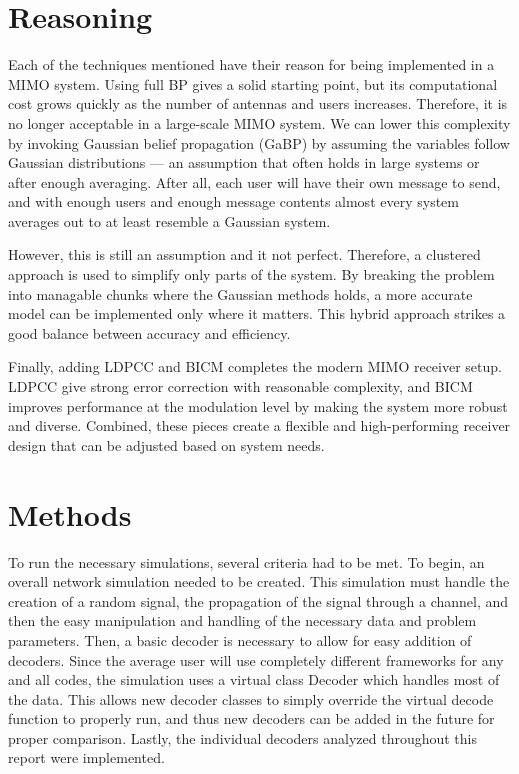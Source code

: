 \documentclass[conference]{IEEEtran}
\begin{document}
\section{Reasoning}
Each of the techniques mentioned have their reason for being implemented in a MIMO system. Using full BP gives a solid starting point, but its computational cost grows quickly as the number of antennas and users increases. Therefore, it is no longer acceptable in a large-scale MIMO system. We can lower this complexity by invoking Gaussian belief propagation (GaBP) by assuming the variables follow Gaussian distributions — an assumption that often holds in large systems or after enough averaging. After all, each user will have their own message to send, and with enough users and enough message contents almost every system averages out to at least resemble a Gaussian system.\par
However, this is still an assumption and it not perfect. Therefore, a clustered approach is used to simplify only parts of the system. By breaking the problem into managable chunks where the Gaussian methods holds, a more accurate model can be implemented only where it matters. This hybrid approach strikes a good balance between accuracy and efficiency.

Finally, adding LDPCC and BICM completes the modern MIMO receiver setup. LDPCC give strong error correction with reasonable complexity, and BICM improves performance at the modulation level by making the system more robust and diverse. Combined, these pieces create a flexible and high-performing receiver design that can be adjusted based on system needs.

\section{Methods}
To run the necessary simulations, several criteria had to be met. To begin, an overall network simulation needed to be created. This simulation must handle the creation of a random signal, the propagation of the signal through a channel, and then the easy manipulation and handling of the necessary data and problem parameters. Then, a basic decoder is necessary to allow for easy addition of decoders. Since the average user will use completely different frameworks for any and all codes, the simulation uses a virtual class Decoder which handles most of the data. This allows new decoder classes to simply override the virtual decode function to properly run, and thus new decoders can be added in the future for proper comparison. Lastly, the individual decoders analyzed throughout this report were implemented.
\end{document}
